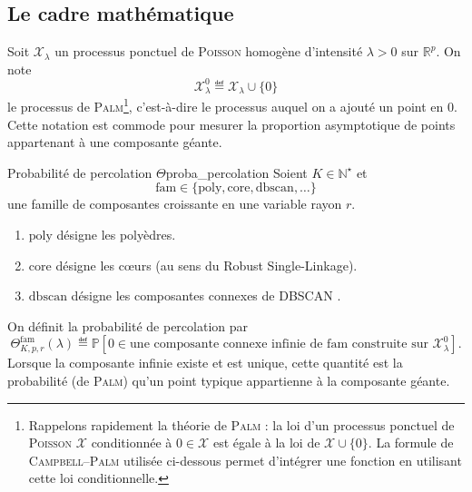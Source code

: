 \subsection{Le cadre mathématique}

Soit $\mathcal X_\lambda$ un processus ponctuel de \textsc{Poisson} \cite{BB} homogène d'intensité $\lambda>0$ sur $\mathbb R^p$. On note
\[
    \mathcal X_\lambda^0 \eqdef \mathcal X_\lambda\cup\{0\}
\]
le processus de \textsc{Palm}\footnote{Rappelons rapidement la théorie de \textsc{Palm} \cite{BB} : la loi d'un processus ponctuel de \textsc{Poisson} $\mathcal X$ conditionnée à $0 \in \mathcal X$ est égale à la loi de $\mathcal X \cup \{0\}$. La formule de \textsc{Campbell--Palm} utilisée ci-dessous permet d'intégrer une fonction en utilisant cette loi conditionnelle.}, c'est-à-dire le processus auquel on a ajouté un point en $0$. Cette notation est commode pour mesurer la proportion asymptotique de points appartenant à une composante géante.

\begin{Definition}{Probabilité de percolation $\Theta$}{proba_percolation}
Soient $K\in\mathbb N^\star$ et
\[
    \mathrm{fam}\in\{\mathrm{poly},\mathrm{core},\mathrm{dbscan},\ldots\}
\]
une famille de composantes croissante en une variable rayon $r$. 
\begin{enumerate}
    \item $\mathrm{poly}$ désigne les polyèdres.
    \item $\mathrm{core}$ désigne les cœurs (au sens du Robust Single-Linkage).
    \item $\mathrm{dbscan}$ désigne les composantes connexes de DBSCAN \cite{DBSCAN}.
\end{enumerate} 

On définit la probabilité de percolation par
\[
    \Theta^{\mathrm{fam}}_{K,p,r}(\lambda)
    \eqdef
    \mathbb P\left[
    0\in \text{une composante connexe infinie de }\mathrm{fam}
    \text{ construite sur }\mathcal X_\lambda^0
    \right].
\]
Lorsque la composante infinie existe et est unique, cette quantité est la probabilité (de \textsc{Palm}) qu'un point typique appartienne à la composante géante.
\end{Definition}

